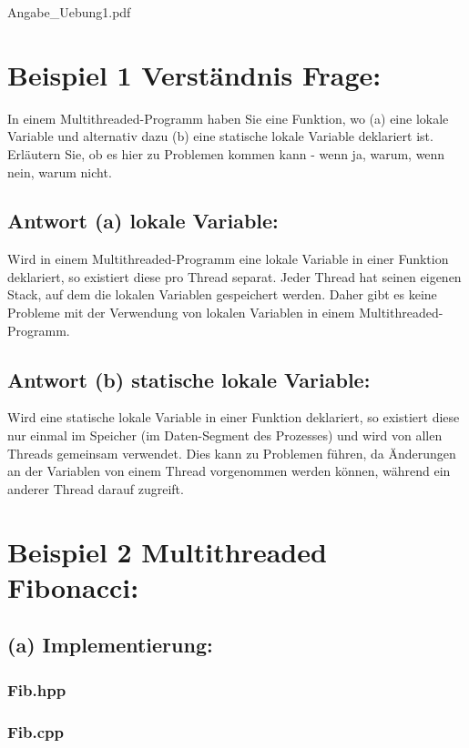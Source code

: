 \documentclass[a4paper,12pt]{article}
\begin{document}
 {Angabe_Uebung1.pdf}
\newpage
\section{Beispiel 1 Verständnis Frage:}
In einem Multithreaded-Programm haben Sie
eine Funktion, wo (a) eine lokale Variable und alternativ dazu (b) eine statische lokale Variable deklariert ist. Erläutern Sie, ob es hier zu Problemen kommen kann - wenn ja, warum,
wenn nein, warum nicht.

\subsection{Antwort (a) lokale Variable:}
Wird in einem Multithreaded-Programm eine lokale Variable in einer Funktion deklariert, so existiert diese pro Thread separat.
Jeder Thread hat seinen eigenen Stack, auf dem die lokalen Variablen gespeichert werden. Daher gibt es keine Probleme mit der Verwendung von lokalen Variablen in einem Multithreaded-Programm.

\subsection{Antwort (b) statische lokale Variable:}
Wird eine statische lokale Variable in einer Funktion deklariert, so existiert diese nur einmal im Speicher (im Daten-Segment des Prozesses) und wird von allen Threads gemeinsam verwendet. Dies kann zu Problemen führen, da Änderungen an der Variablen von einem Thread vorgenommen werden können, während ein anderer Thread darauf zugreift. 

\section{Beispiel 2 Multithreaded Fibonacci:}
\subsection{ (a) Implementierung:}
\subsubsection{Fib.hpp}

\newpage
\subsubsection{Fib.cpp}

\end{document}
